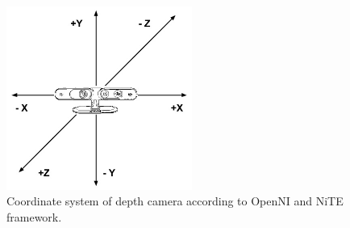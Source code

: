 \begin{figure}
	[h] \centering 
	\includegraphics[height=6cm]{figures/content/xtion-origin.jpg} \caption{Coordinate system of depth camera according to OpenNI and NiTE framework. \cite{12} } \label{fg:xtion:origin} 
\end{figure}
